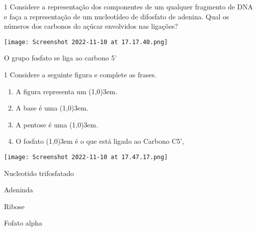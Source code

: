 \documentclass[\mainfilename]{subfiles}
\begin{document}
\begin{questionBox}1{ %
    Considere a representação dos componentes de um qualquer fragmento de DNA e faça a representação de um nucleotídeo de difosfato de adenina. Qual os números dos carbonos do açúcar envolvidos nas ligações?
} %

    \begin{center}
        \texttt{[image: Screenshot 2022-11-10 at 17.17.40.png]}
    \end{center}

    O grupo fosfato se liga ao carbono 5'

    \begin{center}
    \end{center}

\end{questionBox}

\begin{questionBox}1{ %
    Considere a seguinte figura e complete as frases.
} %

    \begin{enumerate}
        \item A figura representa um \line(1,0){3em}. 
        \item A base é uma \line(1,0){3em}. 
        \item A pentose é uma \line(1,0){3em}. 
        \item O fosfato \line(1,0){3em} é o que está ligado ao Carbono C5',
    \end{enumerate}
    
    \begin{center}
        \texttt{[image: Screenshot 2022-11-10 at 17.47.17.png]}
    \end{center}

    \begin{enumerate}
        \begin{multicols}{2}
            \item Nucleotido trifosfatado
            \item Adeninda
            \item Ribose
            \item Fofato alpha
        \end{multicols}
    \end{enumerate}

\end{questionBox}
\end{document}
